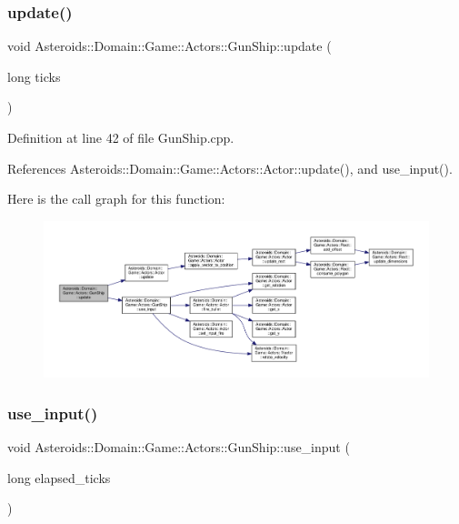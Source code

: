 \subsubsection{\texorpdfstring{update()}{update()}}
{\footnotesize\ttfamily void Asteroids\+::\+Domain\+::\+Game\+::\+Actors\+::\+Gun\+Ship\+::update (\begin{DoxyParamCaption}\item[{long}]{ticks }\end{DoxyParamCaption})}



Definition at line 42 of file Gun\+Ship.\+cpp.



References Asteroids\+::\+Domain\+::\+Game\+::\+Actors\+::\+Actor\+::update(), and use\+\_\+input().

Here is the call graph for this function\+:\nopagebreak
\begin{figure}[H]
\begin{center}
\leavevmode
\includegraphics[width=350pt]{classAsteroids_1_1Domain_1_1Game_1_1Actors_1_1GunShip_a4b37d42d9758c701d75e6a91dda71a5b_cgraph}
\end{center}
\end{figure}
\mbox{\label{classAsteroids_1_1Domain_1_1Game_1_1Actors_1_1GunShip_aae99fa7e1cae7f17c81b68217ed2fa32}} 
\subsubsection{\texorpdfstring{use\+\_\+input()}{use\_input()}}
{\footnotesize\ttfamily void Asteroids\+::\+Domain\+::\+Game\+::\+Actors\+::\+Gun\+Ship\+::use\+\_\+input (\begin{DoxyParamCaption}\item[{long}]{elapsed\+\_\+ticks }\end{DoxyParamCaption})\hspace{0.3cm}{\ttfamily [private]}}



